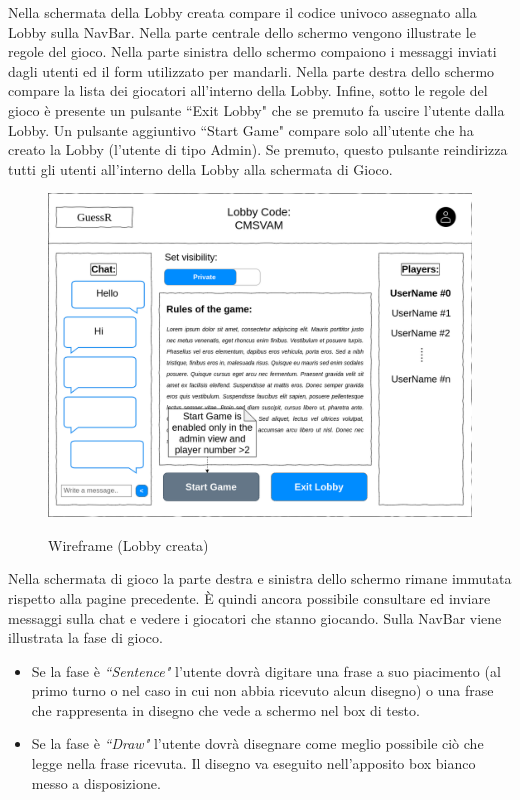 \noindent Nella schermata della Lobby creata compare il codice univoco assegnato alla Lobby sulla NavBar. Nella parte centrale dello schermo vengono illustrate le regole del gioco. Nella parte sinistra dello schermo compaiono i messaggi inviati dagli utenti ed il form utilizzato per mandarli. Nella parte destra dello schermo compare la lista dei giocatori all'interno della Lobby.
Infine, sotto le regole del gioco è presente un pulsante ``Exit Lobby" che se premuto fa uscire l'utente dalla Lobby. Un pulsante aggiuntivo ``Start Game" compare solo all'utente che ha creato la Lobby (l'utente di tipo Admin). Se premuto, questo pulsante reindirizza tutti gli utenti all'interno della Lobby alla schermata di Gioco.

\begin{figure}[H]
    \caption{Wireframe (Lobby creata)}
    \centering
    \includegraphics[width=150mm]{img/ingSoft/wireframeInLobby.png}
    \label{fig:inside_lobby_wireframe}
\end{figure}

\noindent Nella schermata di gioco la parte destra e sinistra dello schermo rimane immutata rispetto alla pagine precedente. È quindi ancora possibile consultare ed inviare messaggi sulla chat e vedere i giocatori che stanno giocando.\newline
Sulla NavBar viene illustrata la fase di gioco.
\begin{itemize}
    \item Se la fase è \textit{``Sentence"} l'utente dovrà digitare una frase a suo piacimento (al primo turno o nel caso in cui non abbia ricevuto alcun disegno) o una frase che rappresenta in disegno che vede a schermo nel box di testo.
    \item Se la fase è \textit{``Draw"} l'utente dovrà disegnare come meglio possibile ciò che legge nella frase ricevuta.
    Il disegno va eseguito nell'apposito box bianco messo a disposizione.
\end{itemize}

